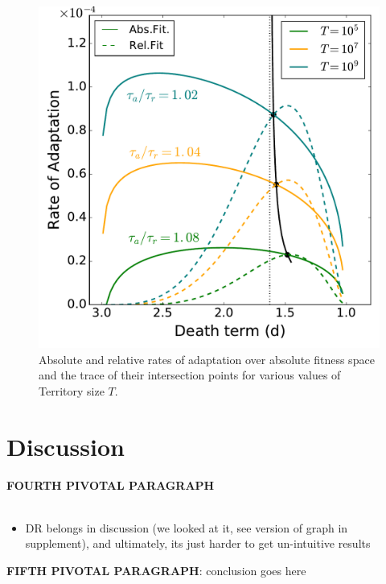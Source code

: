 \documentclass[9pt,twocolumn,twoside]{article}
\begin{document}
\begin{figure}[!h]
    \centering
    \includegraphics[scale=.45]{fig_decrAbsAdaptTerritorySize.pdf}
    \caption{Absolute and relative rates of adaptation over absolute fitness space and the trace of their intersection points for various values of Territory size $T$.}
    \label{fig:intersectVrVafunctT}
\end{figure}

\section{Discussion}
\textbf{FOURTH PIVOTAL PARAGRAPH}
\\ \\
\begin{itemize}
    \item DR belongs in discussion (we looked at it, see version of graph in supplement), and ultimately, its just harder to get un-intuitive results
\end{itemize}


\textbf{FIFTH PIVOTAL PARAGRAPH}: conclusion goes here
\\ \\
\footnotesize


\end{document}
